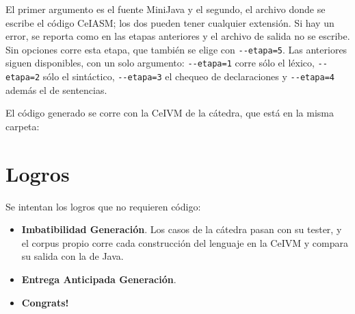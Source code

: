 \documentclass[12pt,a4paper]{article}
\begin{document}
El primer argumento es el fuente MiniJava y el segundo, el archivo donde se escribe el código
CeIASM; los dos pueden tener cualquier extensión. Si hay un error, se reporta como en las etapas
anteriores y el archivo de salida no se escribe. Sin opciones corre esta etapa, que también se elige
con \texttt{-{}-etapa=5}. Las anteriores siguen disponibles, con un solo argumento:
\texttt{-{}-etapa=1} corre sólo el léxico, \texttt{-{}-etapa=2} sólo el sintáctico,
\texttt{-{}-etapa=3} el chequeo de declaraciones y \texttt{-{}-etapa=4} además el de sentencias.

El código generado se corre con la CeIVM de la cátedra, que está en la misma carpeta:


\section{Logros}

Se intentan los logros que no requieren código:

\begin{itemize}
  \item \textbf{Imbatibilidad Generación}. Los casos de la cátedra pasan con su tester, y el corpus
        propio corre cada construcción del lenguaje en la CeIVM y compara su salida con la de Java.
  \item \textbf{Entrega Anticipada Generación}.
  \item \textbf{Congrats!}
\end{itemize}
\end{document}
